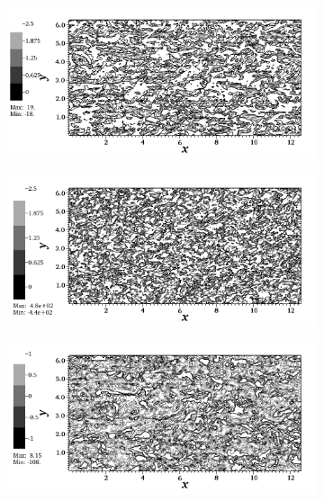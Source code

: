 \begin{figure}
\centering
        \begin{subfigure}[t]{0.5\textwidth}
                \includegraphics[width=\linewidth]{Fig2/x_vorticity_highdiff.png}
                \caption{}
                \label{fig:highdiff}
        \end{subfigure}%
        \centering
        \begin{subfigure}[t]{0.5\textwidth}
                \includegraphics[width=\linewidth]{Fig2/x_vorticity_lowdiff.png}
                \caption{}
                \label{fig:lowdiff}
        \end{subfigure}
       \centering
        \begin{subfigure}[t]{0.5\textwidth}
                \includegraphics[width=\linewidth]{Fig2/z_vorticity_highdiff.png}

\end{subfigure}
\end{figure}
